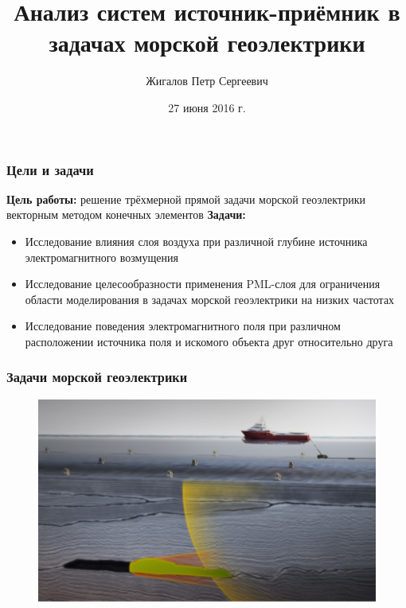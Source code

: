\documentclass[aspectratio=43,usepdftitle=false]{beamer}
\title{Анализ систем источник-приёмник в задачах морской геоэлектрики}
\author{Жигалов Петр Сергеевич}
\institute{Новосибирский государственный технический университет}
\date{27 июня 2016 г.}
\newcommand{\MakeTitle}[1]{\frametitle{\hspace{1.5em}\textbf{#1} \hfill \insertframenumber{} }}
\begin{document}
\begin{frame}
	\titlepage
\end{frame}


\begin{frame}
	\MakeTitle{Цели и задачи}
	\textbf{Цель работы:} решение трёхмерной прямой задачи морской геоэлектрики векторным методом конечных элементов
	\newline\newline
	\textbf{Задачи:}
	\begin{itemize}
		\item Исследование влияния слоя воздуха при различной глубине источника электромагнитного возмущения
		\item Исследование целесообразности применения PML-слоя для ограничения области моделирования в задачах морской геоэлектрики на низких частотах
		\item Исследование поведения электромагнитного поля при различном расположении источника поля и искомого объекта друг относительно друга
	\end{itemize}
\end{frame}


\begin{frame}
	\MakeTitle{Задачи морской геоэлектрики}
	\begin{figure}[ht]
		\includegraphics[width=\textwidth,height=\textheight,keepaspectratio]{10000000000004B4000002D101BC1A4D.png}
	\end{figure}
\end{frame}

\end{document}
